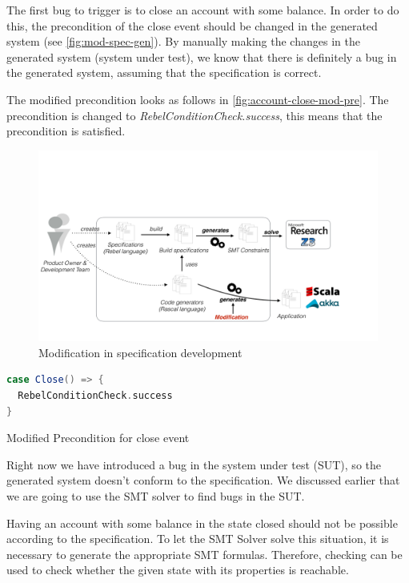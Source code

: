 The first bug to trigger is to close an account with some balance. In order to do this, the precondition of the close event should be changed in the generated system (see \autoref{fig:mod-spec-gen}). By manually making the changes in the generated system (system under test), we know that there is definitely a bug in the generated system, assuming that the specification is correct.

The modified precondition looks as follows in \autoref{fig:account-close-mod-pre}. The precondition is changed to \textit{RebelConditionCheck.success}, this means that the precondition is satisfied.

\begin{figure}[h!]
  \centering
  \includegraphics[scale=0.26]{figures/mod-generated.pdf}
  \caption{Modification in specification development}\label{fig:mod-spec-gen}
\end{figure}

\begin{sourcecode}[h!]
\begin{lstlisting}[language=scala]
case Close() => {
  RebelConditionCheck.success
}
\end{lstlisting}
\caption{Modified Precondition for close event}\label{fig:account-close-mod-pre}
\end{sourcecode}

Right now we have introduced a bug in the system under test (SUT), so the
generated system doesn't conform to the specification. We discussed earlier that
we are going to use the SMT solver to find bugs in the SUT.

Having an account with some balance in the state closed should not be possible
according to the specification. To let the SMT Solver solve this situation, it
is necessary to generate the appropriate SMT formulas. Therefore, checking can
be used to check whether the given state with its properties is reachable.

